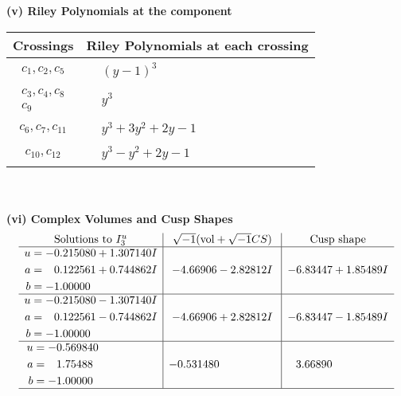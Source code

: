 \documentclass[1p]{elsarticle_modified}
\theoremstyle{definition}
\newcommand{\I}{\sqrt{-1}}
\begin{document}
\newpage\renewcommand{\arraystretch}{1}
\flushleft \textbf{(v) Riley Polynomials at the component}\newline \\
\begin{tabular}{m{50pt}|m{274pt}}
Crossings & \hspace{64pt}Riley Polynomials at each crossing \\
\hline $$\begin{aligned}c_{1},c_{2},c_{5}\end{aligned}$$&$\begin{aligned}
&(y-1)^3
\end{aligned}$\\
\hline $$\begin{aligned}c_{3},c_{4},c_{8}\\c_{9}\end{aligned}$$&$\begin{aligned}
&y^3
\end{aligned}$\\
\hline $$\begin{aligned}c_{6},c_{7},c_{11}\end{aligned}$$&$\begin{aligned}
&y^3+3 y^2+2 y-1
\end{aligned}$\\
\hline $$\begin{aligned}c_{10},c_{12}\end{aligned}$$&$\begin{aligned}
&y^3- y^2+2 y-1
\end{aligned}$\\
\hline
\end{tabular}\\~\\
\newpage\flushleft \textbf{(vi) Complex Volumes and Cusp Shapes}
$$\begin{array}{c|c|c}  
\text{Solutions to }I^u_{3}& \I (\text{vol} + \sqrt{-1}CS) & \text{Cusp shape}\\
 \hline 
\begin{aligned}
u &= -0.215080 + 1.307140 I \\
a &= \phantom{-}0.122561 + 0.744862 I \\
b &= -1.00000\phantom{ +0.000000I}\end{aligned}
 & -4.66906 - 2.82812 I & -6.83447 + 1.85489 I \\ \hline\begin{aligned}
u &= -0.215080 - 1.307140 I \\
a &= \phantom{-}0.122561 - 0.744862 I \\
b &= -1.00000\phantom{ +0.000000I}\end{aligned}
 & -4.66906 + 2.82812 I & -6.83447 - 1.85489 I \\ \hline\begin{aligned}
u &= -0.569840\phantom{ +0.000000I} \\
a &= \phantom{-}1.75488\phantom{ +0.000000I} \\
b &= -1.00000\phantom{ +0.000000I}\end{aligned}
 & -0.531480\phantom{ +0.000000I} & \phantom{-}3.66890\phantom{ +0.000000I}\\
 \hline 
 \end{array}$$\newpage
\end{document}
